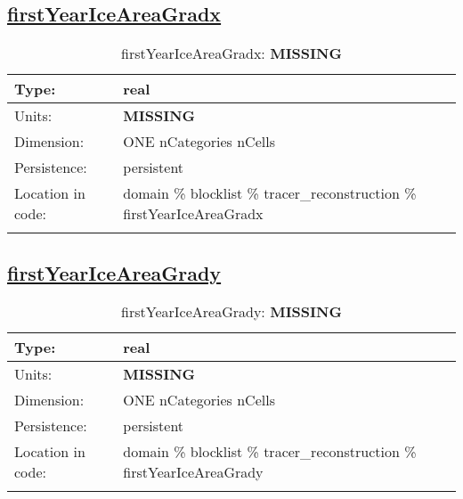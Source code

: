 \subsection[firstYearIceAreaGradx]{\hyperref[sec:var_tab_tracer_reconstruction]{firstYearIceAreaGradx}}
\label{subsec:var_sec_tracer_reconstruction_firstYearIceAreaGradx}
\begin{center}
\begin{longtable}{| p{2.0in} | p{4.0in} |}
        \hline 
        Type: & real \\
        \hline 
        Units: & {\bf \color{red} MISSING} \\
        \hline 
        Dimension: & ONE nCategories nCells \\
        \hline 
        Persistence: & persistent \\
        \hline 
         Location in code: & domain \% blocklist \% tracer\_reconstruction \% firstYearIceAreaGradx \\
         \hline 
    \caption{firstYearIceAreaGradx: {\bf \color{red} MISSING}}
\end{longtable}
\end{center}
\subsection[firstYearIceAreaGrady]{\hyperref[sec:var_tab_tracer_reconstruction]{firstYearIceAreaGrady}}
\label{subsec:var_sec_tracer_reconstruction_firstYearIceAreaGrady}
\begin{center}
\begin{longtable}{| p{2.0in} | p{4.0in} |}
        \hline 
        Type: & real \\
        \hline 
        Units: & {\bf \color{red} MISSING} \\
        \hline 
        Dimension: & ONE nCategories nCells \\
        \hline 
        Persistence: & persistent \\
        \hline 
         Location in code: & domain \% blocklist \% tracer\_reconstruction \% firstYearIceAreaGrady \\
         \hline 
    \caption{firstYearIceAreaGrady: {\bf \color{red} MISSING}}
\end{longtable}
\end{center}
